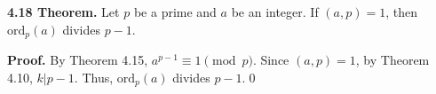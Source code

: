 \documentclass[12pt]{article}
\begin{document}
\noindent\textbf{4.18 Theorem.} Let $p$ be a prime and $a$ be an integer. If $(a,p)=1$, then $\text{ord}_p(a)$ divides $p-1$.

\bigskip

\noindent\textbf{Proof.} By Theorem 4.15, $a^{p-1}\equiv 1\pmod p$. Since $(a,p)=1$, by Theorem 4.10, $k|p-1$. Thus, $\text{ord}_p(a)$ divides $p-1$.\qed
\end{document}
